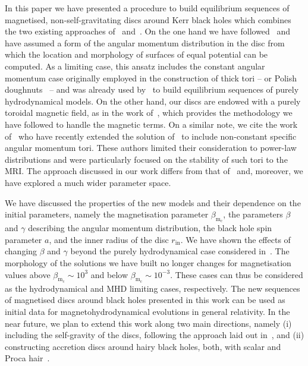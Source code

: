 \documentclass{aa}
\begin{document}
In this paper we have presented a procedure to build equilibrium sequences of magnetised, non-self-gravitating discs around Kerr black holes which combines the two existing approaches of~\citet{Komissarov:2006} and~\citet{Qian:2009}. On the one hand we have followed~\citet{Qian:2009} and have assumed a form of the angular momentum distribution in the disc from which the location and morphology of surfaces of equal potential can be computed. As a limiting case, this ansatz includes the constant angular momentum case originally employed in the construction of thick tori -- or Polish doughnuts~\citep{Abramowicz:1978,Kozlowski:1978}  -- and was already used by~\citet{Qian:2009} to build equilibrium sequences of purely hydrodynamical models. On the other hand, our discs are endowed with a purely toroidal magnetic field, as in the work of~\citet{Komissarov:2006}, which provides the methodology we have followed to handle the magnetic terms. On a similar note, we cite the work of~\citet{Wielgus:2015} who have recently extended the solution of~\citet{Komissarov:2006} to include non-constant specific angular momentum tori. These authors limited their consideration to power-law distributions and were particularly focused on the stability of such tori to the MRI. The approach discussed in our work differs from that of~\citet{Wielgus:2015} and, moreover, we have explored a much wider parameter space.

We have discussed the properties of the new models and their dependence on the initial parameters, namely the magnetisation parameter $\beta_{\mathrm{m}_{\mathrm{c}}}$, the parameters $\beta$ and $\gamma$ describing the angular momentum distribution, the black hole spin parameter $a$, and the inner radius of the disc $r_{\mathrm{in}}$. We have shown the effects of changing $\beta$ and $\gamma$ beyond the purely hydrodynamical case considered in~\citet{Qian:2009}. The morphology of the solutions we have built no longer changes for magnetisation values above $\beta_{\mathrm{m}_{\mathrm{c}}} \sim 10^{3}$ and below $\beta_{\mathrm{m}_{\mathrm{c}}} \sim 10^{-3}$. These cases can thus be considered as the hydrodynamical and MHD limiting cases, respectively. The new sequences of magnetised discs around black holes presented in this work can be used as initial data for magnetohydrodynamical evolutions in general relativity. In the near future, we plan to extend this work along two main directions, namely (i) including the self-gravity of the discs, following the approach laid out in~\citet{Stergioulas:2011}, and (ii) constructing accretion discs around hairy black holes, both, with scalar and Proca hair~\citep{Herdeiro:2014,Herdeiro:2016}.
\end{document}
